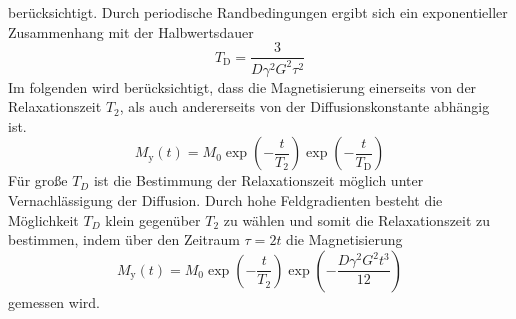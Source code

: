 berücksichtigt. Durch periodische Randbedingungen ergibt sich ein exponentieller
Zusammenhang mit der Halbwertsdauer
\begin{equation}%
  \label{eq:diffkoef}
  T_\text{D} = \frac{3}{D \gamma^2 G^2 \tau^2}
\end{equation}
Im folgenden wird berücksichtigt, dass die Magnetisierung einerseits von der
Relaxationszeit $T_2$, als auch andererseits von der Diffusionskonstante abhängig ist.
\begin{equation}
		\label{eq:my}
		M_\text{y}(t) = M_0 \exp \left( - \frac{t}{T_2} \right) \exp \left( -
		\frac{t}{T_\text{D}} \right)
\end{equation}
Für große $T_D$ ist die Bestimmung der Relaxationszeit möglich unter
Vernachlässigung der Diffusion. 
Durch hohe Feldgradienten besteht die Möglichkeit $T_D$ klein gegenüber $T_2$
zu wählen und somit die Relaxationszeit zu bestimmen, indem über den Zeitraum 
$\tau = 2t$ die Magnetisierung
\begin{equation}
		\label{eq:magy}
		M_\text{y}(t) = M_0 \exp \left( - \frac{t}{T_2} \right) \exp \left( -
		\frac{D \gamma^2 G^2 t^3}{12} \right)
\end{equation}
gemessen wird.
